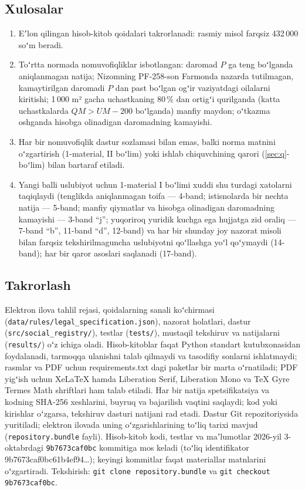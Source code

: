 \documentclass[14pt,a4paper]{extarticle}
\begin{document}
\subsection{Xulosalar}
\begin{enumerate}[leftmargin=1.27cm]
\item Eʼlon qilingan hisob-kitob qoidalari takrorlanadi: rasmiy misol farqsiz 432\,000 soʻm beradi.
\item Toʻrtta normada nomuvofiqliklar isbotlangan: daromad $P$ ga teng boʻlganda aniqlanmagan natija; Nizomning PF-258-son Farmonda nazarda tutilmagan, kamaytirilgan daromadi $P$ dan past boʻlgan ogʻir vaziyatdagi oilalarni kiritishi; 1\,000 m² gacha uchastkaning 80\,\% dan ortigʻi qurilganda (katta uchastkalarda $QM>UM-200$ boʻlganda) manfiy maydon; oʻtkazma oshganda hisobga olinadigan daromadning kamayishi.
\item Har bir nomuvofiqlik dastur sozlamasi bilan emas, balki norma matnini oʻzgartirish (1-material, II boʻlim) yoki ishlab chiquvchining qarori (\ref{sec:q}-boʻlim) bilan bartaraf etiladi.
\item Yangi balli uslubiyot uchun 1-material I boʻlimi xuddi shu turdagi xatolarni taqiqlaydi (tenglikda aniqlanmagan toifa — 4-band; istisnolarda bir nechta natija — 5-band; manfiy qiymatlar va hisobga olinadigan daromadning kamayishi — 3-band “j”; yuqoriroq yuridik kuchga ega hujjatga zid oraliq — 7-band “b”, 11-band “d”, 12-band) va har bir shunday joy nazorat misoli bilan farqsiz tekshirilmaguncha uslubiyotni qoʻllashga yoʻl qoʻymaydi (14-band); har bir qaror asoslari saqlanadi (17-band).
\end{enumerate}

\subsection{Takrorlash}
Elektron ilova tahlil rejasi, qoidalarning sanali koʻchirmasi (\nolinkurl{data/rules/legal_specification.json}), nazorat holatlari, dastur (\nolinkurl{src/social_registry/}), testlar (\nolinkurl{tests/}), mustaqil tekshiruv va natijalarni (\nolinkurl{results/}) oʻz ichiga oladi. Hisob-kitoblar faqat Python standart kutubxonasidan foydalanadi, tarmoqqa ulanishni talab qilmaydi va tasodifiy sonlarni ishlatmaydi; rasmlar va PDF uchun requirements.txt dagi paketlar bir marta oʻrnatiladi; PDF yigʻish uchun XeLaTeX hamda Liberation Serif, Liberation Mono va TeX Gyre Termes Math shriftlari ham talab etiladi. Har bir natija spetsifikatsiya va kodning SHA-256 xeshlarini, buyruq va bajarilish vaqtini saqlaydi; kod yoki kirishlar oʻzgarsa, tekshiruv dasturi natijani rad etadi. Dastur Git repozitoriysida yuritiladi; elektron ilovada uning oʻzgarishlarining toʻliq tarixi mavjud (\nolinkurl{repository.bundle} fayli). Hisob-kitob kodi, testlar va maʼlumotlar 2026-yil 3-oktabrdagi \nolinkurl{9b7673caf0bc} kommitiga mos keladi (toʻliq identifikator 9b7673caf0bc61b4ef94\ldots); keyingi kommitlar faqat materiallar matnlarini oʻzgartiradi. Tekshirish: \nolinkurl{git clone repository.bundle} va \nolinkurl{git checkout 9b7673caf0bc}.
\end{document}
